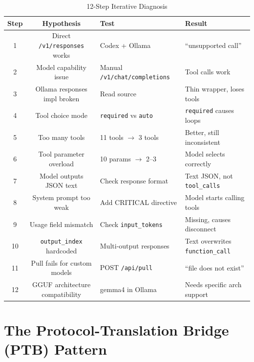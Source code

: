 \documentclass[11pt,a4paper]{article}
\begin{document}
\begin{table}[H]
\centering
\caption{12-Step Iterative Diagnosis}
\label{tab:diagnosis}
\begin{tabular}{ccll}
\toprule
\textbf{Step} & \textbf{Hypothesis} & \textbf{Test} & \textbf{Result} \\
\midrule
1  & Direct \texttt{/v1/responses} works    & Codex + Ollama                  & ``unsupported call'' \\
2  & Model capability issue                 & Manual \texttt{/v1/chat/completions} & Tool calls work \\
3  & Ollama responses impl broken           & Read source                     & Thin wrapper, loses tools \\
4  & Tool choice mode                       & \texttt{required} vs \texttt{auto} & \texttt{required} causes loops \\
5  & Too many tools                         & 11 tools $\rightarrow$ 3 tools  & Better, still inconsistent \\
6  & Tool parameter overload                & 10 params $\rightarrow$ 2--3  & Model selects correctly \\
7  & Model outputs JSON text                & Check response format           & Text JSON, not \texttt{tool\_calls} \\
8  & System prompt too weak                 & Add CRITICAL directive          & Model starts calling tools \\
9  & Usage field mismatch                   & Check \texttt{input\_tokens}    & Missing, causes disconnect \\
10 & \texttt{output\_index} hardcoded       & Multi-output responses          & Text overwrites \texttt{function\_call} \\
11 & Pull fails for custom models           & POST \texttt{/api/pull}         & ``file does not exist'' \\
12 & GGUF architecture compatibility        & gemma4 in Ollama                & Needs specific arch support \\
\bottomrule
\end{tabular}
\end{table}

\section{The Protocol-Translation Bridge (PTB) Pattern}
\end{document}
